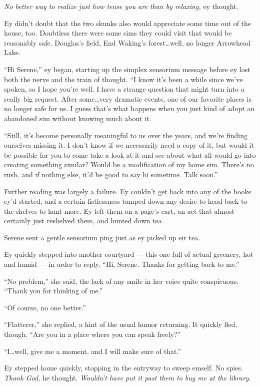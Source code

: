 \emph{No better way to realize just how tense you are than by relaxing,} ey thought.

Ey didn't doubt that the two skunks also would appreciate some time out of the house, too. Doubtless there were some sims they could visit that would be reasonably safe. Douglas's field, End Waking's forest\ldots well, no longer Arrowhead Lake.

``Hi Serene,'' ey began, starting up the simplex sensorium message before ey lost both the nerve and the train of thought. ``I know it's been a while since we've spoken, so I hope you're well. I have a strange question that might turn into a really big request. After some\ldots very dramatic events, one of our favorite places is no longer safe for us. I guess that's what happens when you just kind of adopt an abandoned sim without knowing much about it.

``Still, it's become personally meaningful to us over the years, and we're finding ourselves missing it. I don't know if we necessarily need a copy of it, but would it be possible for you to come take a look at it and see about what all would go into creating something similar? Would be a modification of my home sim. There's no rush, and if nothing else, it'd be good to say hi sometime. Talk soon.''

Further reading was largely a failure. Ey couldn't get back into any of the books ey'd started, and a certain listlessness tamped down any desire to head back to the shelves to hunt more. Ey left them on a page's cart, an act that almost certainly just reshelved them, and hunted down tea.

Serene sent a gentle sensorium ping just as ey picked up eir tea.

Ey quickly stepped into another courtyard — this one full of actual greenery, hot and humid — in order to reply. ``Hi, Serene. Thanks for getting back to me.''

``No problem,'' she said, the lack of any smile in her voice quite conspicuous. ``Thank you for thinking of me.''

``Of course, no one better.''

``Flatterer,'' she replied, a hint of the usual humor returning. It quickly fled, though. ``Are you in a place where you can speak freely?''

``I\ldots well, give me a moment, and I will make sure of that.''

Ey stepped home quickly, stopping in the entryway to sweep emself. No spies. \emph{Thank God,} he thought. \emph{Wouldn't have put it past them to bug me at the library.}

